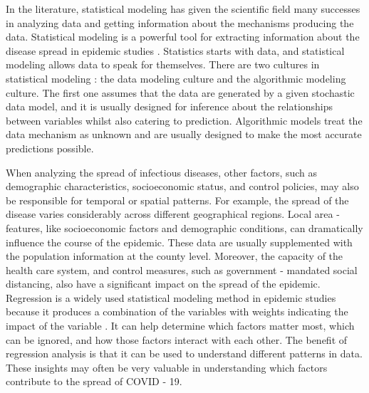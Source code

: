\documentclass[]{book}
\begin{document}
In the literature, statistical modeling has given the scientific field
many successes in analyzing data and getting information about the
mechanisms producing the data. Statistical modeling is a powerful tool
for extracting information about the disease spread in epidemic studies
\citep{Held:etal:20}. Statistics starts with data, and statistical
modeling allows data to speak for themselves. There are two cultures in
statistical modeling \citep{Breiman:01}: the data modeling culture and
the algorithmic modeling culture. The first one assumes that the data
are generated by a given stochastic data model, and it is usually
designed for inference about the relationships between variables whilst
also catering to prediction. Algorithmic models treat the data mechanism
as unknown and are usually designed to make the most accurate
predictions possible.

When analyzing the spread of infectious diseases, other factors, such as
demographic characteristics, socioeconomic status, and control policies,
may also be responsible for temporal or spatial patterns. For example,
the spread of the disease varies considerably across different
geographical regions. Local area - features, like socioeconomic factors
and demographic conditions, can dramatically influence the course of the
epidemic. These data are usually supplemented with the population
information at the county level. Moreover, the capacity of the health
care system, and control measures, such as government - mandated social
distancing, also have a significant impact on the spread of the
epidemic. Regression is a widely used statistical modeling method in
epidemic studies because it produces a combination of the variables with
weights indicating the impact of the variable
\citep{jewell2003statistics}. It can help determine which factors matter
most, which can be ignored, and how those factors interact with each
other. The benefit of regression analysis is that it can be used to
understand different patterns in data. These insights may often be very
valuable in understanding which factors contribute to the spread of
COVID - 19.
\end{document}
